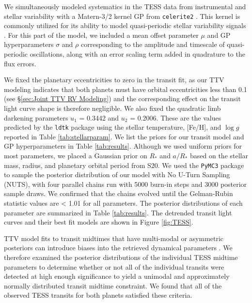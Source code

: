 \documentclass[twocolumn]{aastex631}
\begin{document}
We simultaneously modeled systematics in the TESS data from instrumental and stellar variability with a Matern-3/2 kernel GP from \texttt{celerite2} \citep{exoplanet:foremanmackey17,exoplanet:foremanmackey18}. This kernel is commonly utilized for its ability to model quasi-periodic stellar variability signals \citep[e.g.,][]{Demory_2020,Stefansson_2020,Gan2022,Cointepas2024}. For this part of the model, we included a mean offset parameter $\mu$ and GP hyperparameters $\sigma$ and $\rho$ corresponding to the amplitude and timescale of quasi-periodic oscillations, along with an error scaling term added in quadrature to the flux errors.

We fixed the planetary eccentricities to zero in the transit fit, as our TTV modeling indicates that both planets must have orbital eccentricities less than 0.1 (see \S\ref{sec:Joint TTV RV Modeling}) and the corresponding effect on the transit light curve shape is therefore negligible. We also fixed the quadratic limb darkening parameters $u_1$ = 0.3442 and $u_2$ = 0.2006. These are the values predicted by the \texttt{ldtk} \citep{Parviainen_2015} package using the stellar temperature, [Fe/H], and $\log g$ reported in Table \ref{tab:stellarparam}. We list the priors for our transit model and GP hyperparameters in Table \ref{tab:results}. Although we used uniform priors for most parameters, we placed a Gaussian prior on $R_*$ and $a/R_*$ based on the stellar mass, radius, and planetary orbital period from S20. We used the \texttt{PyMC3} package \citep{exoplanet:pymc3} to sample the posterior distribution of our model with No U-Turn Sampling (NUTS), with four parallel chains run with 5000 burn-in steps and 3000 posterior sample draws. We confirmed that the chains evolved until the Gelman-Rubin statistic values are < 1.01 for all parameters. The posterior distributions of each parameter are summarized in Table \ref{tab:results}. The detrended transit light curves and their best fit models are shown in Figure \ref{fig:TESS}.

TTV model fits to transit midtimes that have multi-modal or asymmetric posteriors can introduce biases into the retrieved dynamical parameters \citep{Judkovsky2023}. We therefore examined the posterior distributions of the individual TESS midtime parameters to determine whether or not all of the individual transits were detected at high enough significance to yield a unimodal and approximately normally distributed transit midtime constraint. We found that all of the observed TESS transits for both planets satisfied these criteria.
\end{document}
